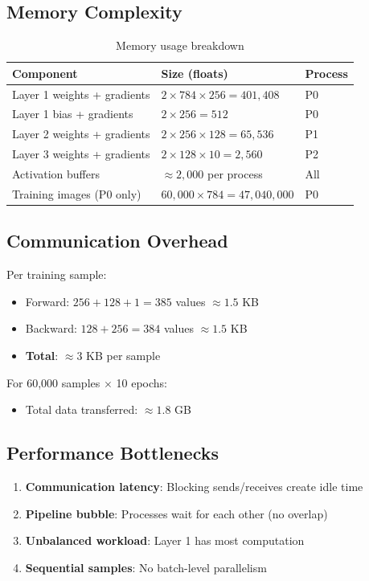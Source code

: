 \documentclass[11pt,a4paper]{article}
\begin{document}
\subsection{Memory Complexity}

\begin{table}[h]
\centering
\begin{tabular}{@{}lll@{}}
\toprule
\textbf{Component} & \textbf{Size (floats)} & \textbf{Process} \\
\midrule
Layer 1 weights + gradients & $2 \times 784 \times 256 = 401,408$ & P0 \\
Layer 1 bias + gradients & $2 \times 256 = 512$ & P0 \\
Layer 2 weights + gradients & $2 \times 256 \times 128 = 65,536$ & P1 \\
Layer 3 weights + gradients & $2 \times 128 \times 10 = 2,560$ & P2 \\
Activation buffers & $\approx 2,000$ per process & All \\
Training images (P0 only) & $60,000 \times 784 = 47,040,000$ & P0 \\
\bottomrule
\end{tabular}
\caption{Memory usage breakdown}
\end{table}

\subsection{Communication Overhead}

Per training sample:
\begin{itemize}
    \item Forward: $256 + 128 + 1 = 385$ values $\approx 1.5$ KB
    \item Backward: $128 + 256 = 384$ values $\approx 1.5$ KB
    \item \textbf{Total}: $\approx 3$ KB per sample
\end{itemize}

For 60,000 samples $\times$ 10 epochs:
\begin{itemize}
    \item Total data transferred: $\approx 1.8$ GB
\end{itemize}

\subsection{Performance Bottlenecks}

\begin{enumerate}
    \item \textbf{Communication latency}: Blocking sends/receives create idle time
    \item \textbf{Pipeline bubble}: Processes wait for each other (no overlap)
    \item \textbf{Unbalanced workload}: Layer 1 has most computation
    \item \textbf{Sequential samples}: No batch-level parallelism
\end{enumerate}
\end{document}
